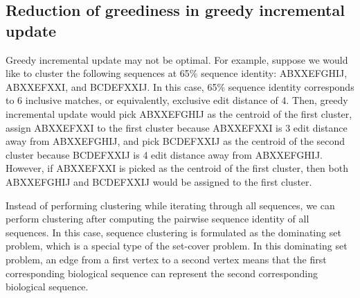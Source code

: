 \documentclass[]{article}
\begin{document}

\iffalse

\subsection{Reduction of greediness in greedy incremental update}

Greedy incremental update may not be optimal. 
For example, suppose we would like to cluster the following sequences at 65\% sequence identity:
ABXXEFGHIJ, 
ABXXEFXXI, and
 BCDEFXXIJ.
In this case, 65\% sequence identity corresponds to 6 inclusive matches, or equivalently, exclusive edit distance of 4.
Then, greedy incremental update would pick ABXXEFGHIJ as the centroid of the first cluster, 
assign ABXXEFXXI to the first cluster because ABXXEFXXI is 3 edit distance away from ABXXEFGHIJ, 
and pick BCDEFXXIJ as the centroid of the second cluster because BCDEFXXIJ is 4 edit distance away from ABXXEFGHIJ.
However, if ABXXEFXXI is picked as the centroid of the first cluster, then both ABXXEFGHIJ and BCDEFXXIJ would be assigned to the first cluster. 

Instead of performing clustering while iterating through all sequences, we can perform clustering after computing the pairwise sequence identity of all sequences. 
In this case, sequence clustering is formulated as the dominating set problem, which is a special type of the set-cover problem. 
In this dominating set problem, an edge from a first vertex to a second vertex means that the first corresponding biological sequence can represent the second corresponding biological sequence. 
\end{document}
